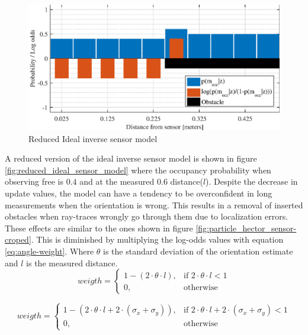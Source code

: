 \begin{figure}[htbp]
	\centering
	\includegraphics[scale=1]{figures/static_mapping/reduced_ideal_sensor_model}
	\caption{Reduced Ideal inverse sensor model}
	\label{fig:reduced_ideal_sensor_model}
\end{figure}

A reduced version of the ideal inverse sensor model is shown in figure \vref{fig:reduced_ideal_sensor_model} where the occupancy probability when observing free is $0.4$ and at the measured $0.6$ distance($l$). 
Despite the decrease in update values, the model can have a tendency to be overconfident in long measurements when the orientation is wrong.
This results in a removal of inserted obstacles when ray-traces wrongly go through them due to localization errors.
These effects are similar to the ones shown in figure \ref{fig:particle_hector_sensor-croped}.
This is diminished by multiplying the log-odds values with equation \vref{eq:angle-weight}.
Where \(\theta \) is the standard deviation of the orientation estimate and \(l\) is the measured distance.
\begin{equation}
\label{eq:angle-weight}
weigth = 
\begin{cases}
1 - ( 2 \cdot \theta \cdot l ), & \text{if } 2 \cdot \theta \cdot l < 1\\
0, & \text{otherwise}
\end{cases}
\end{equation}





\begin{equation}
\label{eq:pose-weight}
weigth = 
\begin{cases}
1 - ( 2 \cdot \theta \cdot l + 2 \cdot (\sigma_x + \sigma_y) ), & \text{if } 2 \cdot \theta \cdot l + 2 \cdot (\sigma_x + \sigma_y) < 1\\
0, & \text{otherwise}
\end{cases}
\end{equation}

